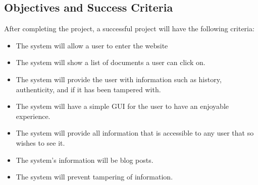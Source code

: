 \subsection{Objectives and Success Criteria}

After completing the project, a successful project will have the following criteria:
\begin{itemize}
	\item The system will allow a user to enter the website
	\item The system will show a list of documents a user can click on.
	\item The system will provide the user with information such as history, authenticity, and if it has been tampered with.
	\item The system will have a simple GUI for the user to have an enjoyable experience.
	\item The system will provide all information that is accessible to any user that so wishes to see it.
	\item The system's information will be blog posts.
	\item The system will prevent tampering of information.
\end{itemize}
